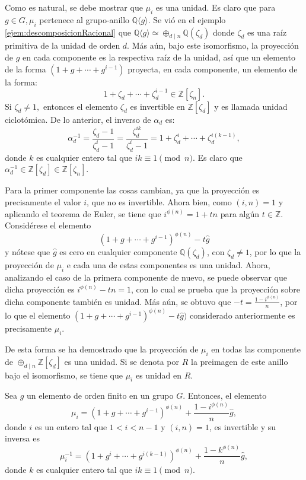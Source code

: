 Como es natural, se debe mostrar que $\mu_i$ es una unidad. Es claro que para $g \in G, \mu_i$ pertenece al grupo-anillo $\mathds{Q} \langle g \rangle$. Se vió en el ejemplo \ref{ejem:descomposicionRacional} que $\mathds{Q}\langle g \rangle \simeq \oplus_{d \mid  n} \mathds{Q}(\zeta_d)$ donde $\zeta_d$ es una raíz primitiva de la unidad de orden $d$. Más aún, bajo este isomorfismo, la proyección de $g$ en cada componente es la respectiva raíz de la unidad, así que un elemento de la forma $(1+g+\cdots+g^{i-1})$ proyecta, en cada componente, un elemento de la forma: \[ 1+\zeta_d + \cdots +\zeta_d^{i-1} \in \mathds{Z}[\zeta_n].  \] Si $\zeta_d \neq 1,$ entonces el elemento $\zeta_d$ es invertible en $\mathds{Z}[\zeta_d]$ y es llamada unidad ciclotómica. De lo anterior, el inverso de $\alpha_d$ es: \[ \alpha_d^{-1} = \frac{\zeta_d-1}{\zeta_d^i-1} = \frac{\zeta_d^{ik}}{\zeta_d^{i}-1} = 1+\zeta_d^i + \cdots + \zeta_d^{i(k-1)}, \] donde $k$ es cualquier entero tal que $ik \equiv 1 \pmod{n} $. Es claro que $\alpha_d^{-1} \in \mathds{Z}[\zeta_d] \in \mathds{Z}[\zeta_n]$.

Para la primer componente las cosas cambian, ya que la proyección es precisamente el valor $i$, que no es invertible. Ahora bien, como $(i,n) = 1$ y aplicando el teorema de Euler, se tiene que $i^{\phi(n)} = 1 + tn$ para algún $t \in \mathds{Z}$. Considérese el elemento \[  (1+g+\cdots +g^{i-1})^{\phi(n)} -t\hat{g} \] y nótese que $\hat{g}$ es cero en cualquier componente $\mathds{Q}(\zeta_d)$, con $\zeta_d \neq 1$, por lo que la proyección de $\mu_i$ e cada una de estas componentes es una unidad. Ahora, analizando el caso de la primera componente de nuevo, se puede observar que dicha proyección es $i^{\phi(n)}-tn = 1$, con lo cual se prueba que la proyección sobre dicha componente también es unidad. Más aún, se obtuvo que $-t = \frac{1-i^{\phi(n)}}{n}$, por lo que el elemento $(1+g+\cdots+g^{i-1})^{\phi(n)} -t\hat{g})$ considerado anteriormente es precisamente $\mu_i$. 

De esta forma se ha demostrado que la proyección de $\mu_i$ en todas las componente de $\oplus_{d \mid n}\mathds{Z}[\zeta_d]$ es una unidad. Si se denota por $R$ la preimagen de este anillo bajo el isomorfismo, se tiene que $\mu_i$ es unidad en $R$.
\begin{proposicion}
Sea $g$ un elemento de orden finito en un grupo $G$. Entonces, el elemento \[  \mu_i = (1+g+\cdots+g^{i-1})^{\phi(n)} + \frac{1-i^{\phi(n)}}{n}\hat{g}, \] donde $i$ es un entero tal que $1<i<n-1$ y $(i,n) = 1$, es invertible y su inversa es \[  \mu_i^{-1} = (1+g^i + \cdots + g^{i(k-1)})^{\phi(n)} + \frac{1-k^{\phi(n)}}{n}\hat{g},\] donde $k$ es cualquier entero tal que $ik \equiv 1 \pmod
{n}$.
\end{proposicion}

